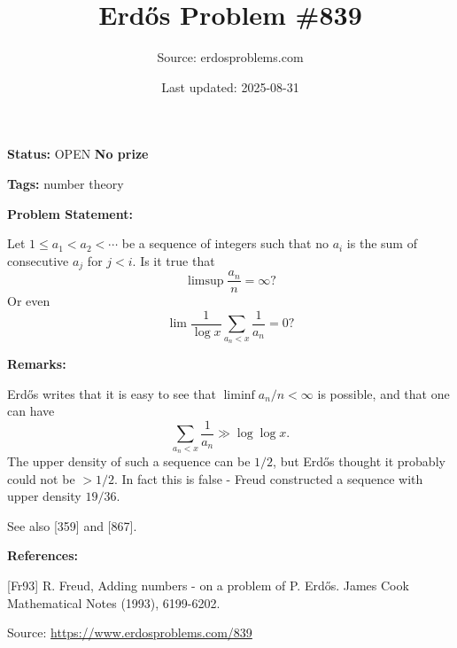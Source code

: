\documentclass{article}
\title{Erd\H{o}s Problem \#839}
\date{Last updated: 2025-08-31}
\author{Source: erdosproblems.com}
\begin{document}
\maketitle

\noindent\textbf{Status:} OPEN \quad \textbf{No prize}

\noindent\textbf{Tags:} number theory

\medskip
\noindent\textbf{Problem Statement:}

Let $1\leq a_1<a_2<\cdots$ be a sequence of integers such that no $a_i$ is the sum of consecutive $a_j$ for $j<i$. Is it true that\[\limsup \frac{a_n}{n}=\infty?\]Or even\[\lim \frac{1}{\log x}\sum_{a_n<x}\frac{1}{a_n}=0?\]

\bigskip
\noindent\textbf{Remarks:}

Erd\H{o}s writes that it is easy to see that $\liminf a_n/n<\infty$ is possible, and that one can have\[\sum_{a_n< x}\frac{1}{a_n}\gg \log\log x.\]The upper density of such a sequence can be $1/2$, but Erd\H{o}s thought it probably could not be $>1/2$. In fact this is false - Freud \cite{Fr93} constructed a sequence with upper density $19/36$. 

See also [359] and [867].

\bigskip
\noindent\textbf{References:}

[Fr93] R. Freud, Adding numbers - on a problem of P. Erd\H{o}s. James Cook Mathematical Notes (1993), 6199-6202.

\bigskip
\noindent\small{Source: \url{https://www.erdosproblems.com/839}}
\end{document}

